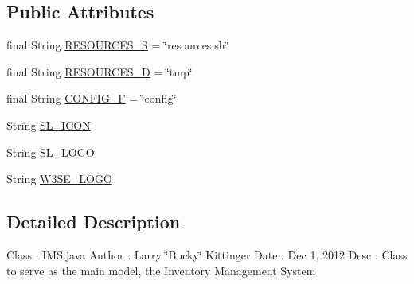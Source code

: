 \subsection*{Public Attributes}
\begin{DoxyCompactItemize}
\item 
final String \hyperlink{classw3se_1_1_model_1_1_i_m_s_a9d24fecc0bafc942c529dd1700cba7d2}{R\-E\-S\-O\-U\-R\-C\-E\-S\-\_\-\-S} = \char`\"{}resources.\-slr\char`\"{}
\item 
final String \hyperlink{classw3se_1_1_model_1_1_i_m_s_a68c70498a2d0137a0f9793f4e414a729}{R\-E\-S\-O\-U\-R\-C\-E\-S\-\_\-\-D} = \char`\"{}tmp\char`\"{}
\item 
final String \hyperlink{classw3se_1_1_model_1_1_i_m_s_a2efd11a7e744fc72a8c66c78f3626b91}{C\-O\-N\-F\-I\-G\-\_\-\-F} = \char`\"{}config\char`\"{}
\item 
String \hyperlink{classw3se_1_1_model_1_1_i_m_s_a53f9517bd3166639b2b605e730f07632}{S\-L\-\_\-\-I\-C\-O\-N}
\item 
String \hyperlink{classw3se_1_1_model_1_1_i_m_s_a9309c235b5a4dc95714257769f663d3d}{S\-L\-\_\-\-L\-O\-G\-O}
\item 
String \hyperlink{classw3se_1_1_model_1_1_i_m_s_a39e505844130ace37f4c8e351ea6ec87}{W3\-S\-E\-\_\-\-L\-O\-G\-O}
\end{DoxyCompactItemize}


\subsection{Detailed Description}
Class \-: I\-M\-S.\-java Author \-: Larry \char`\"{}\-Bucky\char`\"{} Kittinger Date \-: Dec 1, 2012 Desc \-: Class to serve as the main model, the Inventory Management System 


